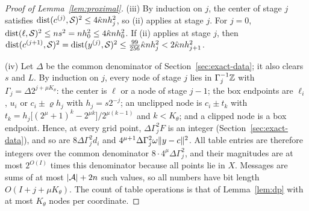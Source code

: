 \begin{proof}[Proof of Lemma~\ref{lem:proximal}]
(iii) By induction on $j$, the center of stage $j$ satisfies
$\operatorname{dist}(c^{(j)},\mathcal S)^2\le4\hat\kappa nh_j^2$, so (ii) applies at stage
$j$. For $j=0$, $\operatorname{dist}(\ell,\mathcal S)^2\le ns^2=nh_0^2\le4\hat\kappa nh_0^2$.
If (ii) applies at stage $j$, then
$\operatorname{dist}(c^{(j+1)},\mathcal S)^2=\operatorname{dist}(y^{(j)},\mathcal S)^2
\le\frac{99}{256}\hat\kappa nh_j^2<2\hat\kappa nh_{j+1}^2$.

(iv) Let $\Delta$ be the common denominator of Section~\ref{sec:exact-data};
it also clears $s$ and $L$. By induction on $j$, every node of stage $j$ lies
in $\Gamma_j^{-1}\mathbb Z$ with $\Gamma_j=\Delta2^{j+\mu K_\theta}$: the center is
$\ell$ or a node of stage $j-1$; the box endpoints are $\ell_i$, $u_i$ or
$c_i\pm\varrho h_j$ with $h_j=s2^{-j}$; an unclipped node is $c_i\pm t_k$ with
$t_k=h_j\bigl[(2^\mu+1)^k-2^{\mu k}\bigr]/2^{\mu(k-1)}$ and $k<K_\theta$; and a
clipped node is a box endpoint. Hence, at every grid point, $\Delta\Gamma_j^2F$
is an integer (Section~\ref{sec:exact-data}), and so are $8\Delta\Gamma_j^2d_i$
and $4^{\mu+1}\Delta\Gamma_j^2\omega\lVert y-c\rVert^2$. All table entries are
therefore integers over the common denominator $8\cdot4^\mu\Delta\Gamma_j^2$,
and their magnitudes are at most $2^{O(I)}$ times this denominator because
all points lie in $X$. Messages are sums of at most $\lvert \mathcal A\rvert+2n$
such values, so all numbers have bit length $O(I+j+\mu K_\theta)$. The count
of table operations is that of Lemma~\ref{lem:dp} with at most $K_\theta$
nodes per coordinate.
\end{proof}

